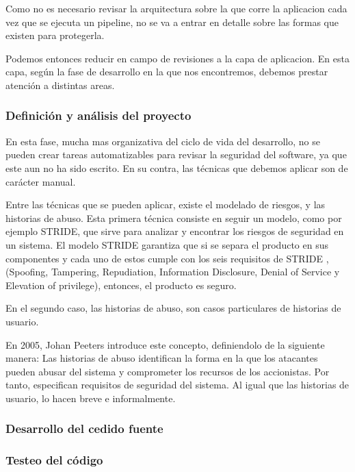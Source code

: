 \documentclass[12pt]{report} %
\begin{document}
Como no es necesario revisar la arquitectura sobre la que corre la
aplicacion cada vez que se ejecuta un \Gls{pipeline}, no se va a entrar en 
detalle sobre las formas que existen para protegerla.

Podemos entonces reducir en campo de revisiones a la capa de aplicacion.
En esta capa, según la fase de desarrollo en la que nos encontremos, debemos
prestar atención a distintas areas.

\subsubsection{Definición y análisis del proyecto}

En esta fase, mucha mas organizativa del ciclo de vida del desarrollo, no se
pueden crear tareas automatizables para revisar la seguridad del software, ya
que este aun no ha sido escrito.
En su contra, las técnicas que debemos aplicar son de carácter manual.

Entre las técnicas que se pueden aplicar, existe el modelado de riesgos, y las
historias de abuso.
Esta primera técnica consiste en seguir un modelo, como por ejemplo
\gls{STRIDE}, que sirve para analizar y encontrar los riesgos de seguridad en un
sistema.  
El modelo \gls{STRIDE} garantiza que si se separa el producto en sus
componentes y cada uno de estos cumple con los seis requisitos de \gls{STRIDE}
\cite{Loren1999}, (Spoofing, Tampering, Repudiation, Information Disclosure,
Denial of Service y Elevation of privilege), entonces, el producto es seguro.

En el segundo caso, las historias de abuso, son casos particulares de historias
de usuario.

En 2005, Johan Peeters introduce este concepto, definiendolo de la siguiente
manera: 
Las historias de abuso identifican la forma en la que los atacantes pueden
abusar del sistema y comprometer los recursos de los accionistas.
Por tanto, especifican requisitos de seguridad del sistema.
Al igual que las historias de usuario, lo hacen breve e
informalmente.\cite{Peeters2005}

\subsubsection{Desarrollo del cedido fuente}
\subsubsection{Testeo del código}
\end{document}
